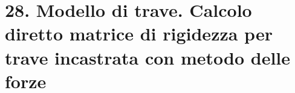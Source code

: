 \section{28. Modello di trave. Calcolo diretto matrice di rigidezza per trave incastrata con metodo delle forze}


